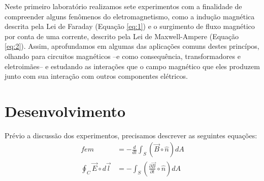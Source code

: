 \documentclass[12pt, a4paper, notitlepage]{article}
\begin{document}
        \hspace{0.5cm} Neste primeiro laboratório realizamos sete experimentos com a finalidade de compreender alguns fenômenos do eletromagnetismo, como a indução magnética descrita pela Lei de Faraday (Equação \ref{eq:1}) e o surgimento de fluxo magnético por conta de uma corrente, descrito pela Lei de Maxwell-Ampere (Equação \ref{eq:2}). Assim, aprofundamos em algumas das aplicações comuns destes princípos, olhando para circuitos magnéticos --e como consequência, transformadores e eletroimães-- e estudando as interações que o campo magnético que eles produzem junto com sua interação com outros componentes elétricos.
        
        \section{Desenvolvimento}
        
        
        
        Prévio a discussão dos experimentos, precisamos descrever as seguintes equações:
        \begin{equation}
            \begin{split}
            fem &= -\frac{d}{dt}\int_{S}(\vec{B}\circ\hat{n})dA \\
            \oint_{C}\vec{E}\circ d\vec{l} &= -\int_{S}(\frac{\partial \vec{B}}{\partial t}\circ\hat{n})dA
            \end{split}\label{eq:1}
        \end{equation}
        
\end{document}
